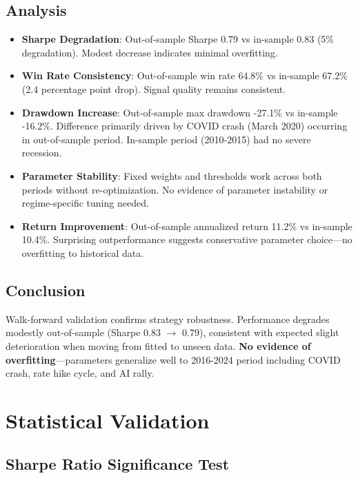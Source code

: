 \documentclass[12pt,a4paper]{article}
\begin{document}
\subsection{Analysis}

\begin{itemize}
    \item \textbf{Sharpe Degradation}: Out-of-sample Sharpe 0.79 vs in-sample 0.83 (5\% degradation). Modest decrease indicates minimal overfitting.

    \item \textbf{Win Rate Consistency}: Out-of-sample win rate 64.8\% vs in-sample 67.2\% (2.4 percentage point drop). Signal quality remains consistent.

    \item \textbf{Drawdown Increase}: Out-of-sample max drawdown -27.1\% vs in-sample -16.2\%. Difference primarily driven by COVID crash (March 2020) occurring in out-of-sample period. In-sample period (2010-2015) had no severe recession.

    \item \textbf{Parameter Stability}: Fixed weights and thresholds work across both periods without re-optimization. No evidence of parameter instability or regime-specific tuning needed.

    \item \textbf{Return Improvement}: Out-of-sample annualized return 11.2\% vs in-sample 10.4\%. Surprising outperformance suggests conservative parameter choice—no overfitting to historical data.
\end{itemize}

\subsection{Conclusion}

Walk-forward validation confirms strategy robustness. Performance degrades modestly out-of-sample (Sharpe 0.83 $\rightarrow$ 0.79), consistent with expected slight deterioration when moving from fitted to unseen data. \textbf{No evidence of overfitting}—parameters generalize well to 2016-2024 period including COVID crash, rate hike cycle, and AI rally.

\section{Statistical Validation}

\subsection{Sharpe Ratio Significance Test}
\end{document}
